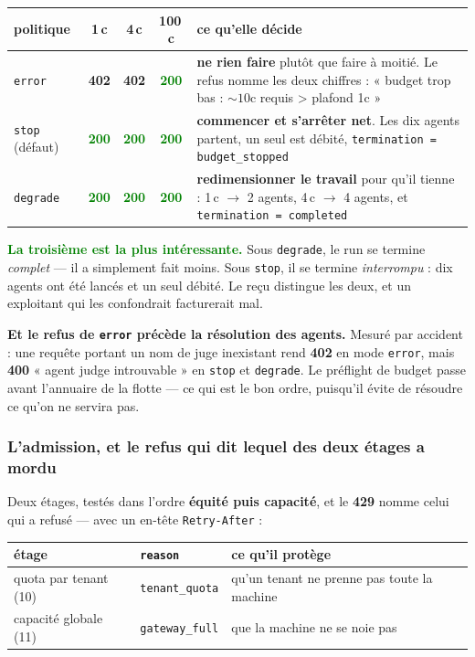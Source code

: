 \documentclass[10pt]{report}
\newcommand{\code}[1]{\texttt{\small #1}}
\newcommand{\ok}[1]{\textcolor{green}{\textbf{#1}}}
\newcommand{\att}[1]{\textcolor{amber}{\textbf{#1}}}
\begin{document}
\begin{longtable}{@{}p{2.4cm} c c c p{6.4cm}@{}}
\toprule \textbf{politique} & \textbf{1\,c} & \textbf{4\,c} & \textbf{100\,c} & \textbf{ce qu'elle décide} \\ \midrule \endhead
\code{error} & \att{402} & \att{402} & \ok{200} & \textbf{ne rien faire} plutôt que faire à moitié. Le refus nomme les deux chiffres : « budget trop bas : ${\sim}10$c requis > plafond 1c » \\
\code{stop} \footnotesize(défaut) & \ok{200} & \ok{200} & \ok{200} & \textbf{commencer et s'arrêter net}. Les dix agents partent, un seul est débité, \code{termination = budget\_stopped} \\
\code{degrade} & \ok{200} & \ok{200} & \ok{200} & \textbf{redimensionner le travail} pour qu'il tienne : 1\,c $\rightarrow$ 2 agents, 4\,c $\rightarrow$ 4 agents, et \code{termination = completed} \\
\bottomrule
\end{longtable}

\ok{La troisième est la plus intéressante.} Sous \code{degrade}, le run se termine \emph{complet} ---
il a simplement fait moins. Sous \code{stop}, il se termine \emph{interrompu} : dix agents ont été
lancés et un seul débité. Le reçu distingue les deux, et un exploitant qui les confondrait facturerait
mal.

\att{Et le refus de \code{error} précède la résolution des agents.} Mesuré par accident : une requête
portant un nom de juge inexistant rend \att{402} en mode \code{error}, mais \att{400}
« agent judge introuvable » en \code{stop} et \code{degrade}. Le préflight de budget passe avant
l'annuaire de la flotte --- ce qui est le bon ordre, puisqu'il évite de résoudre ce qu'on ne servira
pas.

\subsubsection*{L'admission, et le refus qui dit lequel des deux étages a mordu}

Deux étages, testés dans l'ordre \textbf{équité puis capacité}, et le \att{429} nomme celui qui a
refusé --- avec un en-tête \code{Retry-After} :

\begin{longtable}{@{}p{4.4cm} p{4.0cm} p{6.6cm}@{}}
\toprule \textbf{étage} & \code{reason} & \textbf{ce qu'il protège} \\ \midrule \endhead
quota par tenant (10) & \code{tenant\_quota} & qu'un tenant ne prenne pas toute la machine \\
capacité globale (11) & \code{gateway\_full} & que la machine ne se noie pas \\
\bottomrule
\end{longtable}
\end{document}
